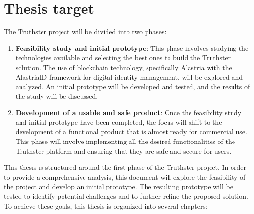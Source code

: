 \documentclass[target=mst,aauheader=]{thud}
\begin{document}
\section{Thesis target}

The Truthster project will be divided into two phases:

\begin{enumerate}

    \item \textbf{Feasibility study and initial prototype}: This phase involves studying the technologies available and selecting the best ones to build the Truthster solution. The use of blockchain technology, specifically Alastria with the AlastriaID framework for digital identity management, will be explored and analyzed. An initial prototype will be developed and tested, and the results of the study will be discussed.
    \item \textbf{Development of a usable and safe product}: Once the feasibility study and initial prototype have been completed, the focus will shift to the development of a functional product that is almost ready for commercial use. This phase will involve implementing all the desired functionalities of the Truthster platform and ensuring that they are safe and secure for users.

\end{enumerate}

This thesis is structured around the first phase of the Truthster project. In order to provide a comprehensive analysis, this document will explore the feasibility of the project and develop an initial prototype. The resulting prototype will be tested to identify potential challenges and to further refine the proposed solution.
To achieve these goals, this thesis is organized into several chapters:
\end{document}
